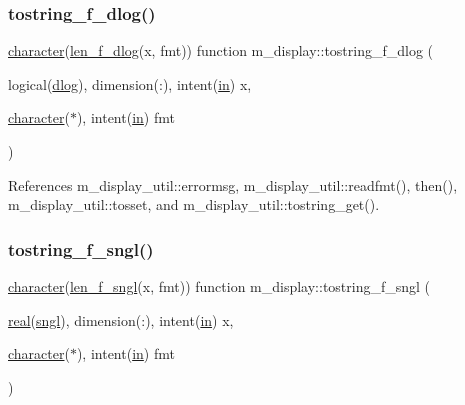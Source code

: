 \subsubsection{\texorpdfstring{tostring\+\_\+f\+\_\+dlog()}{tostring\_f\_dlog()}}
{\footnotesize\ttfamily \hyperlink{option__stopwatch_83_8txt_abd4b21fbbd175834027b5224bfe97e66}{character}(\hyperlink{namespacem__display_a2a298a8f2faf00047152b93cd265d396}{len\+\_\+f\+\_\+dlog}(x, fmt)) function m\+\_\+display\+::tostring\+\_\+f\+\_\+dlog (\begin{DoxyParamCaption}\item[{logical(\hyperlink{namespacem__display_a8c6a3df510feabf6bc84dd0a8789f98c}{dlog}), dimension(\+:), intent(\hyperlink{M__journal_83_8txt_afce72651d1eed785a2132bee863b2f38}{in})}]{x,  }\item[{\hyperlink{option__stopwatch_83_8txt_abd4b21fbbd175834027b5224bfe97e66}{character}($\ast$), intent(\hyperlink{M__journal_83_8txt_afce72651d1eed785a2132bee863b2f38}{in})}]{fmt }\end{DoxyParamCaption})\hspace{0.3cm}{\ttfamily [private]}}



References m\+\_\+display\+\_\+util\+::errormsg, m\+\_\+display\+\_\+util\+::readfmt(), then(), m\+\_\+display\+\_\+util\+::tosset, and m\+\_\+display\+\_\+util\+::tostring\+\_\+get().

\mbox{\label{namespacem__display_a3c751ef3422139ca7190d5b0d64638a8}} 
\subsubsection{\texorpdfstring{tostring\+\_\+f\+\_\+sngl()}{tostring\_f\_sngl()}}
{\footnotesize\ttfamily \hyperlink{option__stopwatch_83_8txt_abd4b21fbbd175834027b5224bfe97e66}{character}(\hyperlink{namespacem__display_ae0feb946fbc4c31f8ba53e20719fa508}{len\+\_\+f\+\_\+sngl}(x, fmt)) function m\+\_\+display\+::tostring\+\_\+f\+\_\+sngl (\begin{DoxyParamCaption}\item[{\hyperlink{read__watch_83_8txt_abdb62bde002f38ef75f810d3a905a823}{real}(\hyperlink{namespacem__display_a2ac86bc535c3ccc5947dbb3109c666b5}{sngl}), dimension(\+:), intent(\hyperlink{M__journal_83_8txt_afce72651d1eed785a2132bee863b2f38}{in})}]{x,  }\item[{\hyperlink{option__stopwatch_83_8txt_abd4b21fbbd175834027b5224bfe97e66}{character}($\ast$), intent(\hyperlink{M__journal_83_8txt_afce72651d1eed785a2132bee863b2f38}{in})}]{fmt }\end{DoxyParamCaption})\hspace{0.3cm}{\ttfamily [private]}}



